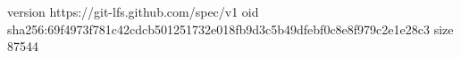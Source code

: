 version https://git-lfs.github.com/spec/v1
oid sha256:69f4973f781c42cdcb501251732e018fb9d3c5b49dfebf0c8e8f979c2e1e28c3
size 87544
